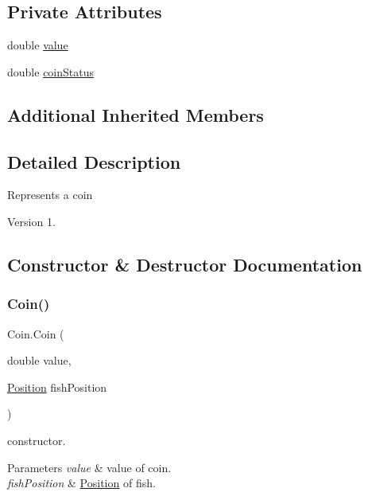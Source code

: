 \subsection*{Private Attributes}
\begin{DoxyCompactItemize}
\item 
double \mbox{\hyperlink{class_coin_a1f18db679edab240c514b9a4dc47ec97}{value}}
\item 
double \mbox{\hyperlink{class_coin_abf41bb0f883b43451460f3021ec6eed9}{coin\+Status}}
\end{DoxyCompactItemize}
\subsection*{Additional Inherited Members}


\subsection{Detailed Description}
Represents a coin \begin{DoxyVersion}{Version}
1. 
\end{DoxyVersion}


\subsection{Constructor \& Destructor Documentation}
\mbox{\label{class_coin_ac75958fbac44671f534e83cde5df013b}} 
\subsubsection{\texorpdfstring{Coin()}{Coin()}}
{\footnotesize\ttfamily Coin.\+Coin (\begin{DoxyParamCaption}\item[{double}]{value,  }\item[{\mbox{\hyperlink{class_position}{Position}}}]{fish\+Position }\end{DoxyParamCaption})\hspace{0.3cm}{\ttfamily [inline]}}

constructor. 
\begin{DoxyParams}{Parameters}
{\em value} & value of coin. \\
\hline
{\em fish\+Position} & \mbox{\hyperlink{class_position}{Position}} of fish. \\
\hline
\end{DoxyParams}


